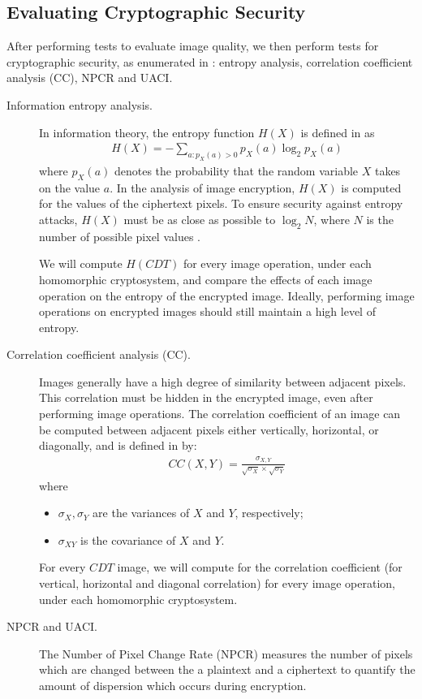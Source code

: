 \subsection{Evaluating Cryptographic Security}
After performing tests to evaluate image quality, we then perform tests for cryptographic security, as enumerated in \cite{ahmed_benchmark_2016}: entropy analysis, correlation coefficient analysis (CC), NPCR and UACI.
\begin{description}
	\item [Information entropy analysis.] In information theory, the entropy function $H(X)$ is defined in \cite{bauer_information_2005} as
	\begin{align}
		H(X) = - \sum_{a:p_X(a)>0}{p_X(a)\log_2{p_X(a)}}
	\end{align}
	where $p_X(a)$ denotes the probability that the random variable $X$ takes on the value $a$.
	In the analysis of image encryption, $H(X)$ is computed for the values of the ciphertext pixels. To ensure security against entropy attacks, $H(X)$ must be as close as possible to $\log_2{N}$, where $N$ is the number of possible pixel values \cite{ahmed_benchmark_2016}.

	We will compute $H(CDT)$ for every image operation, under each homomorphic cryptosystem, and compare the effects of each image operation on the entropy of the encrypted image. Ideally, performing image operations on encrypted images should still maintain a high level of entropy.
	\item [Correlation coefficient analysis (CC).]
		Images generally have a high degree of similarity between adjacent pixels. This correlation must be hidden in the encrypted image, even after performing image operations.
		The correlation coefficient of an image can be computed between adjacent pixels either vertically, horizontal, or diagonally, and is defined in \cite{ahmed_benchmark_2016} by:
		\begin{align}
			CC(X,Y) = \frac{\sigma_{X,Y}}{\sqrt{\sigma_X}\times\sqrt{\sigma_Y}}
		\end{align}
		where
		\begin{itemize}
			\item $\sigma_X, \sigma_Y$ are the variances of $X$ and $Y$, respectively;
			\item $\sigma_{XY}$ is the covariance of $X$ and $Y$.
		\end{itemize}

		For every $CDT$ image, we will compute for the correlation coefficient (for vertical, horizontal and diagonal correlation) for every image operation, under each homomorphic cryptosystem.
	\item [NPCR and UACI.]
		The Number of Pixel Change Rate (NPCR) measures the number of pixels which are changed between the a plaintext and a ciphertext to quantify the amount of dispersion which occurs during encryption.


\end{description}

